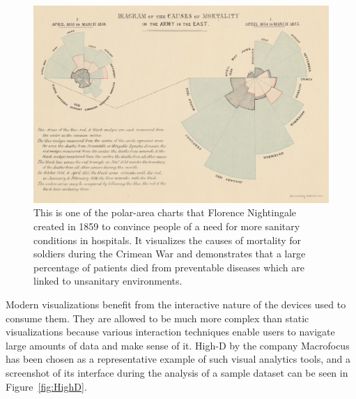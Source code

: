 \begin{figure}[tp]
\centering
\includegraphics[keepaspectratio,width=\linewidth,height=\fullh / 3]{images/nightingale.png}
\caption[Polar-Area Chart by Florence Nightingale From 1859]{
  This is one of the polar-area charts that Florence Nightingale created in 1859 to convince people of a need for more sanitary conditions in hospitals.
  It visualizes the causes of mortality for soldiers during the Crimean War and demonstrates that a large percentage of patients died from preventable diseases which are linked to unsanitary environments.
}
\label{fig:NightingalePolarAreaChart}
\end{figure}

Modern visualizations benefit from the interactive nature of the devices used to consume them.
They are allowed to be much more complex than static visualizations because various interaction techniques enable users to navigate large amounts of data and make sense of it.
High-D by the company Macrofocus \parencite{HighD} has been chosen as a representative example of such visual analytics tools, and a screenshot of its interface during the analysis of a sample dataset can be seen in Figure~\ref{fig:HighD}.

